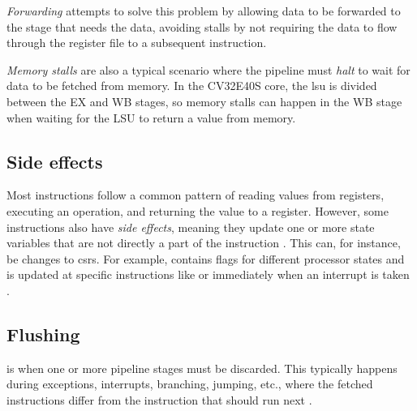 \textit{Forwarding} attempts to solve this problem by allowing data to be forwarded to the stage that needs the data, avoiding stalls by not requiring the data to flow through the register file to a subsequent instruction.

\textit{Memory stalls} are also a typical scenario where the pipeline must \textit{halt} to wait for data to be fetched from memory. In the CV32E40S core, the \acrshort{lsu} is divided between the EX and WB stages, so memory stalls can happen in the WB stage when waiting for the LSU to return a value from memory.


\subsection{Side effects}

Most instructions follow a common pattern of reading values from registers, executing an operation, and returning the value to a register.
However, some instructions also have \textit{side effects}, meaning they update one or more state variables that are not directly a part of the instruction \cite{taylorAdvancedRISCVVerification2023}. This can, for instance, be changes to \acrshort{csr}s. For example,  contains flags for different processor states and is updated at specific instructions like  or immediately when an interrupt is taken \cite{openhwgroupExceptionsInterruptsCOREV2023}. 


%

\subsection{Flushing}
\label{sec:bg_flushing}

 is when one or more pipeline stages must be discarded. This typically happens during exceptions, interrupts, branching, jumping, etc., where the fetched instructions differ from the instruction that should run next \cite{pattersonComputerOrganizationDesign2021}.

